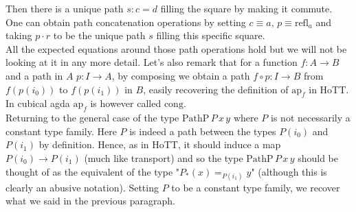\documentclass{report}
\begin{document}
\begin{center}
\end{center}
Then there is a unique path $s : c = d$ filling the square by making it commute. One can obtain path concatenation operations by setting $c \equiv a$, $p \equiv \mathrm{refl}_a$ and taking $p \cdot r$ to be the unique path $s$ filling this specific square.\\
All the expected equations around those path operations hold but we will not be looking at it in any more detail. Let's also remark that for a function $f : A \rightarrow B$ and a path in $A$ $p: I \rightarrow A$, by composing we obtain a path $f \circ p : I \rightarrow B$ from $f(p(i_0))$ to $f(p(i_1))$ in $B$, easily recovering the definition of $\mathrm{ap}_f$ in HoTT. In cubical agda $\mathrm{ap}_f$ is however called $\mathrm{cong}$. \\
Returning to the general case of the type $\mathrm{PathP} \hspace{2pt} P \hspace{2pt} x \hspace{2pt} y$ where $P$ is not necessarily a constant type family. Here $P$ is indeed a path between the types $P(i_0)$ and $P(i_1)$ by definition. Hence, as in HoTT, it should induce a map $P(i_0) \rightarrow P(i_1)$ (much like transport) and so the type $\mathrm{PathP} \hspace{2pt} P \hspace{2pt} x \hspace{2pt} y$ should be thought of as the equivalent of the type "$P_*(x)=_{P(i_1)} y$" (although this is clearly an abusive notation). Setting $P$ to be a constant type family, we recover what we said in the previous paragraph.
\end{document}
